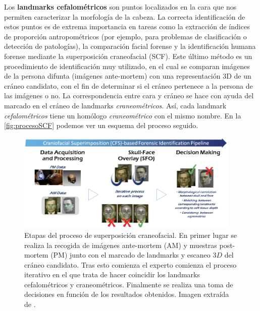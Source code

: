     \noindent Los \textbf{landmarks cefalométricos} son puntos localizados en la cara que nos permiten caracterizar la morfología de la cabeza. La correcta identificación de estos puntos es de extrema importancia en tareas como la extracción de índices de proporción antropométricos (por ejemplo, para problemas de clasificación o detección de patologías), la comparación facial forense y la identificación humana forense mediante la superposición craneofacial (SCF). Este último método es un procedimiento de identificación muy utilizado, en el cual se comparan imágenes de la persona difunta (imágenes ante-mortem) con una representación 3D de un cráneo candidato, con el fin de determinar si el cráneo pertenece a la persona de las imágenes o no. La correspondencia entre cara y cráneo se hace con ayuda del marcado en el cráneo de landmarks \textit{craneométricos}. Así, cada landmark \textit{cefalométricos} tiene un homólogo \textit{craneométrico} con el mismo nombre. En la \autoref{fig:procesoSCF}  podemos ver un esquema del proceso seguido.

    \begin{figure}[!h]
        \centering
        \includegraphics[width=0.95\textwidth]{img/SCF.png}
        \caption{Etapas del proceso de superposición craneofacial. En primer lugar se realiza la recogida de imágenes ante-mortem (AM) y muestras post-mortem (PM) junto con el marcado de landmarks y escaneo $3D$ del cráneo candidato. Tras esto comienza el experto comienza el proceso iterativo en el que trata de hacer coincidir los landmarks cefalométricos y craneométricos. Finalmente se realiza una toma de decisiones en función de los resultados obtenidos. Imagen extraída de \cite{article}.}
        \label{fig:procesoSCF}
    \end{figure}

    \medskip

